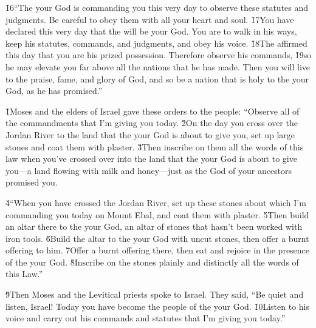 \v{16}``The  your God is commanding you this very day to observe these statutes and judgments. Be careful to obey them with all your heart and soul. \v{17}You have declared this very day that the  will be your God. You are to walk in his ways, keep his statutes, commands, and judgments, and obey his voice. \v{18}The  affirmed this day that you are his prized possession. Therefore observe his commands, \v{19}so he may elevate you far above all the nations that he has made. Then you will live to the praise, fame, and glory of God, and so be a nation that is holy to the  your God, as he has promised.''

\v{1}Moses and the elders of Israel gave these orders to the people: ``Observe all of the commandments that I'm giving you today. \v{2}On the day you cross over the Jordan River to the land that the  your God is about to give you, set up large stones and coat them with plaster. \v{3}Then inscribe on them all the words of this law when you've crossed over into the land that the  your God is about to give you---a land flowing with milk and honey---just as the  God of your ancestors promised you.

\v{4}``When you have crossed the Jordan River, set up these stones about which I'm commanding you today on Mount Ebal, and coat them with plaster. \v{5}Then build an altar there to the  your God, an altar of stones that hasn't been worked with iron tools. \v{6}Build the altar to the  your God with uncut stones, then offer a burnt offering to him. \v{7}Offer a burnt offering there, then eat and rejoice in the presence of the  your God. \v{8}Inscribe on the stones plainly and distinctly all the words of this Law.''

\v{9}Then Moses and the Levitical priests spoke to Israel. They said, ``Be quiet and listen, Israel! Today you have become the people of the  your God. \v{10}Listen to his voice and carry out his commands and statutes that I'm giving you today.''

